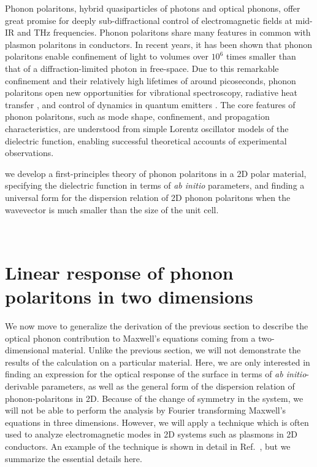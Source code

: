 \documentclass[aps,prb,twocolumn,
	groupedaddress,superscriptaddress,
	amsfonts,amssymb,amsmath,floatfix,
	citeautoscript]{revtex4-1}
\begin{document}
Phonon polaritons, hybrid quasiparticles of photons and optical phonons, offer great promise for deeply sub-diffractional control of electromagnetic fields at mid-IR and THz frequencies. Phonon polaritons share many features in common with plasmon polaritons in conductors. In recent years, it has been shown that phonon polaritons enable confinement of light to volumes over $10^6$ times smaller than that of a diffraction-limited photon in free-space\cite{caldwell2013low,xu2014mid,caldwell2014sub,dai2014tunable,tomadin2015accessing,yoxall2015direct,li2015hyperbolic,dai2015subdiffractional,dai2015graphene,caldwell2015low,li2016reversible,Basov:2016,basov2017towards,low2017polaritons,giles2017ultra}. Due to this remarkable confinement and their relatively high lifetimes of around picoseconds, phonon polaritons open new opportunities for vibrational spectroscopy, radiative heat transfer \cite{hillenbrand2002phonon}, and control of dynamics in quantum emitters \cite{kumar2015tunable,rivera2017making,kurman2018control}. The core features of phonon polaritons, such as mode shape, confinement, and propagation characteristics, are understood from simple Lorentz oscillator models of the dielectric function, enabling successful theoretical accounts of experimental observations.

we develop a first-principles theory of phonon polaritons in a 2D polar material, specifying the dielectric function in terms of \emph{ab initio} parameters, and finding a universal form for the dispersion relation of 2D phonon polaritons when the wavevector is much smaller than the size of the unit cell.

\
\section{Linear response of phonon polaritons in two dimensions}
We now move to generalize the derivation of the previous section to describe the optical phonon contribution to Maxwell's equations coming from a two-dimensional material. 
Unlike the previous section, we will not demonstrate the results of the calculation on a particular material.
Here, we are only interested in finding an expression for the optical response of the surface in terms of \emph{ab initio}-derivable parameters, as well as the general form of the dispersion relation of phonon-polaritons in 2D.
Because of the change of symmetry in the system, we will not be able to perform the analysis by Fourier transforming Maxwell's equations in three dimensions.
However, we will apply a technique which is often used to analyze electromagnetic modes in 2D systems such as plasmons in 2D conductors.
An example of the technique is shown in detail in Ref.~\citenum{jablan2009plasmonics}, but we summarize the essential details here. 
\end{document}
